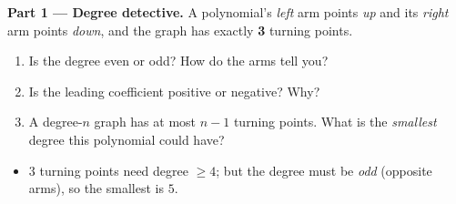 \documentclass[10pt]{article}
\begin{document}
\begin{tcolorbox}[colback=white, colframe=black!40, title=\textbf{Tier E --- Extension},
    fonttitle=\bfseries, arc=1.5mm, left=3mm, right=3mm, top=2mm, bottom=2mm, breakable]
\textbf{Part 1 --- Degree detective.} A polynomial's \emph{left} arm points \emph{up} and its
\emph{right} arm points \emph{down}, and the graph has exactly \textbf{3} turning points.
\begin{enumerate}[label=(\alph*), leftmargin=1.8em, itemsep=4pt]
  \item Is the degree even or odd?  \quad How do the arms tell you? 
  \item Is the leading coefficient positive or negative?  Why? 
  \item A degree-$n$ graph has at most $n-1$ turning points. What is the \emph{smallest} degree this
        polynomial could have? 
\end{enumerate}
\begin{itemize}[leftmargin=1.4em, nosep]
  \item[] \footnotesize $3$ turning points need degree $\ge 4$; but the degree must be \emph{odd} (opposite arms), so the smallest is $5$.
\end{itemize}


\end{tcolorbox}
\end{document}
